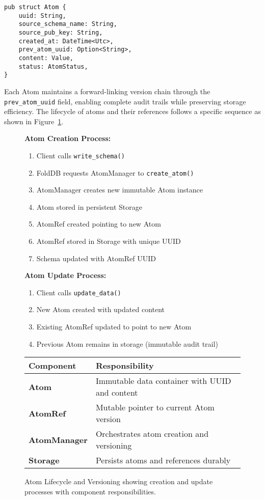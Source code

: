 \documentclass[11pt,a4paper]{article}
\begin{document}
\begin{lstlisting}[caption=Atom Structure Definition]
pub struct Atom {
    uuid: String,
    source_schema_name: String,
    source_pub_key: String,
    created_at: DateTime<Utc>,
    prev_atom_uuid: Option<String>,
    content: Value,
    status: AtomStatus,
}
\end{lstlisting}

Each Atom maintains a forward-linking version chain through the \texttt{prev\_atom\_uuid} field, enabling complete audit trails while preserving storage efficiency. The lifecycle of atoms and their references follows a specific sequence as shown in Figure~\ref{fig:atom_lifecycle}.

\begin{figure}[htbp]
\centering

\textbf{Atom Creation Process:}
\begin{enumerate}
\item Client calls \texttt{write\_schema()}
\item FoldDB requests AtomManager to \texttt{create\_atom()}
\item AtomManager creates new immutable Atom instance
\item Atom stored in persistent Storage
\item AtomRef created pointing to new Atom
\item AtomRef stored in Storage with unique UUID
\item Schema updated with AtomRef UUID
\end{enumerate}

\vspace{0.5cm}

\textbf{Atom Update Process:}
\begin{enumerate}
\item Client calls \texttt{update\_data()}
\item New Atom created with updated content
\item Existing AtomRef updated to point to new Atom
\item Previous Atom remains in storage (immutable audit trail)
\end{enumerate}

\vspace{0.5cm}

\begin{tabular}{|l|l|}
\hline
\textbf{Component} & \textbf{Responsibility} \\
\hline
\textbf{Atom} & Immutable data container with UUID and content \\
\textbf{AtomRef} & Mutable pointer to current Atom version \\
\textbf{AtomManager} & Orchestrates atom creation and versioning \\
\textbf{Storage} & Persists atoms and references durably \\
\hline
\end{tabular}

\caption{Atom Lifecycle and Versioning showing creation and update processes with component responsibilities.}
\label{fig:atom_lifecycle}
\end{figure}
\end{document}

